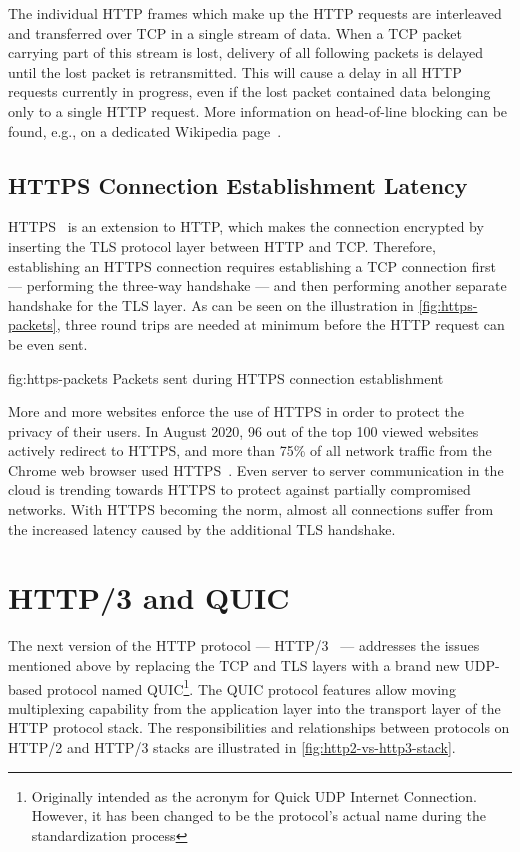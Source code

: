 The individual HTTP frames which make up the HTTP requests are interleaved and transferred over TCP
in a single stream of data. When a TCP packet carrying part of this stream is lost, delivery of all
following packets is delayed until the lost packet is retransmitted. This will cause a delay in all
HTTP requests currently in progress, even if the lost packet contained data belonging only to a
single HTTP request. More information on head-of-line blocking can be found, e.g., on a dedicated
Wikipedia page~\cite{wiki:head-of-line-blocking}.

\subsection*{HTTPS Connection Establishment Latency}

HTTPS~\cite{rfc2818} is an extension to HTTP, which makes the connection encrypted by inserting the
TLS protocol layer between HTTP and TCP. Therefore, establishing an HTTPS connection requires
establishing a TCP connection first --- performing the three-way handshake --- and then performing
another separate handshake for the TLS layer. As can be seen on the illustration in
\autoref{fig:https-packets}, three round trips are needed at minimum before the HTTP request can be
even sent.

\begin{myFigure} {fig:https-packets} {Packets sent during HTTPS connection establishment}

  \resizebox{0.8\linewidth}{!}{}

\end{myFigure}

More and more websites enforce the use of HTTPS in order to protect the privacy of their users. In
August 2020, 96 out of the top 100 viewed websites actively redirect to HTTPS, and more than 75\% of
all network traffic from the Chrome web browser used HTTPS~\cite{googleTransparency}. Even server to
server communication in the cloud is trending towards HTTPS to protect against partially compromised
networks. With HTTPS becoming the norm, almost all connections suffer from the increased latency
caused by the additional TLS handshake.

\section{HTTP/3 and QUIC}

The next version of the HTTP protocol --- HTTP/3~\cite{draft-ietf-quic-http} --- addresses the issues
mentioned above by replacing the TCP and TLS layers with a brand new UDP-based protocol named
QUIC\footnote{Originally intended as the acronym for Quick UDP Internet Connection. However, it has
been changed to be the protocol's actual name during the standardization process}. The QUIC protocol
features allow moving multiplexing capability from the application layer into the transport layer of
the HTTP protocol stack. The responsibilities and relationships between protocols on HTTP/2 and
HTTP/3 stacks are illustrated in \autoref{fig:http2-vs-http3-stack}.

